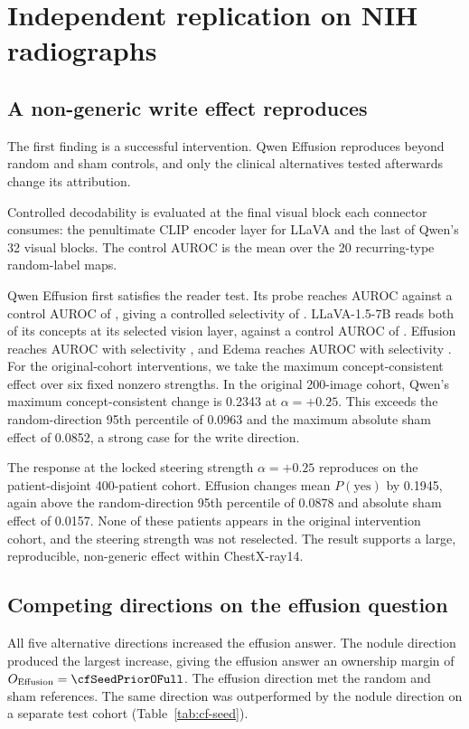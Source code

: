 \section{Independent replication on NIH radiographs}
\label{app:seed-results}



\subsection{A non-generic write effect reproduces}
\label{sec:qwen-replication}

The first finding is a successful intervention. Qwen Effusion reproduces beyond random and sham controls, and only the clinical alternatives tested afterwards change its attribution.

Controlled decodability is evaluated at the final visual block each connector consumes: the penultimate CLIP encoder layer for LLaVA and the last of Qwen's 32 visual blocks. The control AUROC is the mean over the 20 recurring-type random-label maps.

Qwen Effusion first satisfies the reader test. Its probe reaches AUROC \cfSeedDecQwenEffAuroc{} against a control AUROC of \cfSeedDecQwenEffCtrl{}, giving a controlled selectivity of \cfSeedDecQwenEffSel{}. LLaVA-1.5-7B reads both of its concepts at its selected vision layer, against a control AUROC of \cfSeedDecLlavaEffCtrl{}. Effusion reaches AUROC \cfSeedDecLlavaEffAuroc{} with selectivity \cfSeedDecLlavaEffSel{}, and Edema reaches AUROC \cfSeedDecLlavaEdemaAuroc{} with selectivity \cfSeedDecLlavaEdemaSel{}. For the original-cohort interventions, we take the maximum concept-consistent effect over six fixed nonzero strengths. In the original 200-image cohort, Qwen's maximum concept-consistent change is 0.2343 at $\alpha=+0.25$. This exceeds the random-direction 95th percentile of 0.0963 and the maximum absolute sham effect of 0.0852, a strong case for the write direction.

The response at the locked steering strength $\alpha=+0.25$ reproduces on the patient-disjoint 400-patient cohort. Effusion changes mean $P(\mathrm{yes})$ by 0.1945, again above the random-direction 95th percentile of 0.0878 and absolute sham effect of 0.0157. None of these patients appears in the original intervention cohort, and the steering strength was not reselected. The result supports a large, reproducible, non-generic effect within ChestX-ray14.


\subsection{Competing directions on the effusion question}
\label{sec:specificity-results}

All five alternative directions increased the effusion answer. The nodule direction produced the largest increase, giving the effusion answer an ownership margin of $O_{\mathrm{Effusion}}=\cfSeedPriorOFull$. The effusion direction met the random and sham references. The same direction was outperformed by the nodule direction on a separate test cohort (Table~\ref{tab:cf-seed}).
